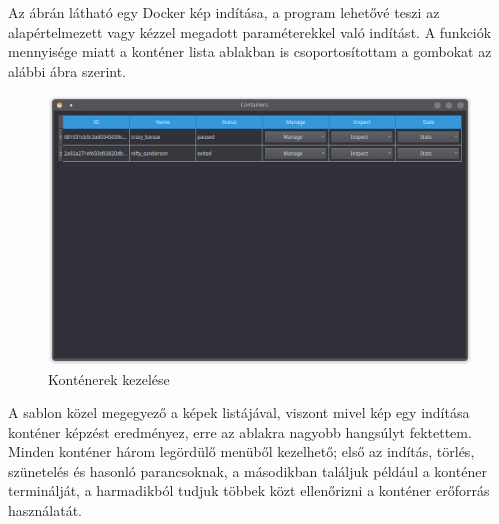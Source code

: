 Az ábrán látható egy Docker kép indítása, a program lehetővé teszi az alapértelmezett vagy kézzel megadott paraméterekkel való indítást.
\newpage
A funkciók mennyisége miatt a konténer lista ablakban is csoportosítottam a gombokat az alábbi ábra szerint.

\begin{figure}[H]
	\centering
	\includegraphics[scale=0.45]{images/final_list-template}
	\caption{Konténerek kezelése}
	\label{final}
\end{figure}
 
A sablon közel megegyező a képek listájával, viszont mivel kép egy indítása konténer képzést eredményez, erre az ablakra nagyobb hangsúlyt fektettem. Minden konténer három legördülő menüből kezelhető; első az indítás, törlés, szünetelés és hasonló parancsoknak, a másodikban találjuk például a konténer terminálját, a harmadikból tudjuk többek közt ellenőrizni a konténer erőforrás használatát.


